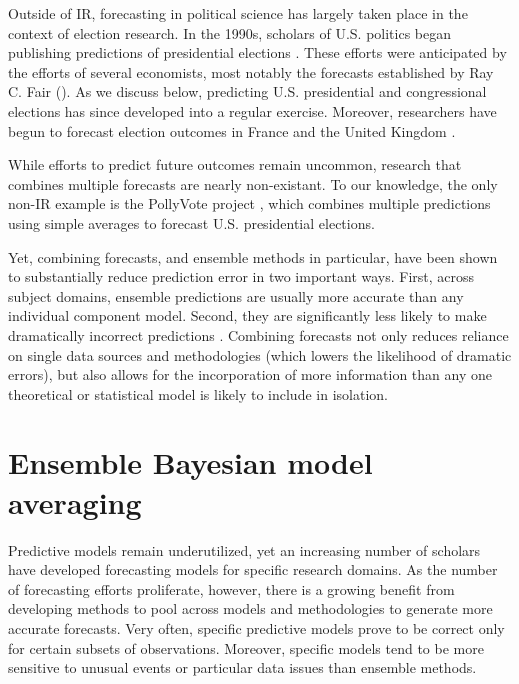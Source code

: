 Outside of IR, forecasting in political science has largely taken
place in the context of election research.  In the 1990s, scholars of
U.S. politics began publishing predictions of presidential elections
\citep{Campbell:1990, Campbell:1992}. These efforts were anticipated
by the efforts of several economists, most notably the forecasts
established by Ray C. Fair (\citeyear{Fair:1978}). As we discuss
below, predicting U.S. presidential and congressional elections has
since developed into a regular exercise.  Moreover, researchers have
begun to forecast election outcomes in France
\citep[e.g.,][]{Jerome:1999} and the United Kingdom
\citep[e.g.,][]{Whitely:2005}.

While efforts to predict future outcomes remain uncommon, research
that combines multiple forecasts are nearly non-existant.  To our
knowledge, the only non-IR example is the PollyVote project
\citep[c.f.][]{Graefe:2010}, which combines multiple predictions using
simple averages to forecast U.S. presidential elections.

Yet, combining forecasts, and ensemble methods in particular, have
been shown to substantially reduce prediction error in two important
ways.  First, across subject domains, ensemble predictions are usually
more accurate than any individual component model. Second, they are
significantly less likely to make dramatically incorrect predictions
\citep{Bates:1969, Armstrong:2001, Raftery:2005}.  Combining forecasts
not only reduces reliance on single data sources and methodologies
(which lowers the likelihood of dramatic errors), but also allows for
the incorporation of more information than any one theoretical or
statistical model is likely to include in isolation. 

\section{Ensemble Bayesian model averaging} 

Predictive models remain underutilized, yet an increasing number of
scholars have developed forecasting models for specific research
domains.  As the number of forecasting efforts proliferate, however,
there is a growing benefit from developing methods to pool across
models and methodologies to generate more accurate forecasts.  Very
often, specific predictive models prove to be correct only for certain
subsets of observations.  Moreover, specific models tend to be more
sensitive to unusual events or particular data issues than ensemble
methods.

